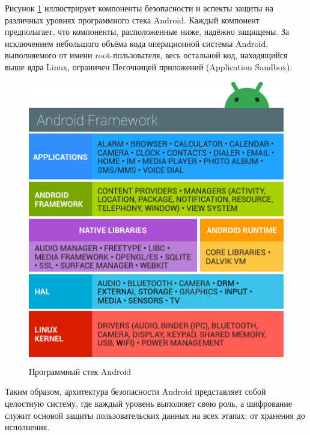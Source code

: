 Рисунок \ref{fig:fig01} иллюстрирует компоненты безопасности и аспекты защиты
на различных уровнях программного стека Android. Каждый компонент предполагает,
что компоненты, расположенные ниже, надёжно защищены. За исключением небольшого
объёма кода операционной системы Android, выполняемого от имени
root-пользователя, весь остальной код, находящийся выше ядра Linux, ограничен
Песочницей приложений (Application Sandbox).

\begin{figure}
    \centering
    \includegraphics[scale=0.6]{inc/android-software-stack.png}
    \caption{ Программный стек Android }
    \label{fig:fig01}
\end{figure}

Таким образом, архитектура безопасности Android представляет собой целостную
систему, где каждый уровень выполняет свою роль, а шифрование служит основой
защиты пользовательских данных на всех этапах: от хранения до исполнения.
